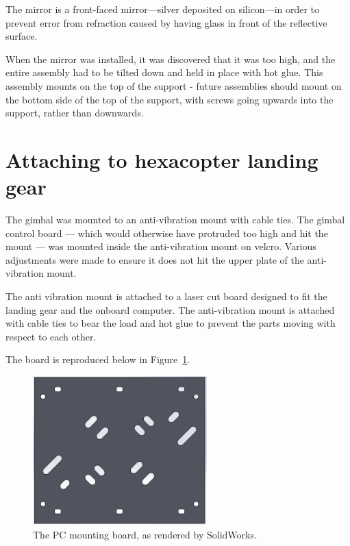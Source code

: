 \documentclass[12pt,oneside,a4paper,draft]{book}
\begin{document}
The mirror is a front-faced mirror---silver deposited on silicon---in
order to prevent error from refraction caused by having glass in front
of the reflective surface.

When the mirror was installed, it was discovered that it was too high,
and the entire assembly had to be tilted down and held in place with
hot glue. This assembly mounts on the top of the support - future
assemblies should mount on the bottom side of the top of the support,
with screws going upwards into the support, rather than downwards.

\newpage
\section{Attaching to hexacopter landing gear}
\label{sec:attach-hexac-land}

The gimbal was mounted to an anti-vibration mount with cable
ties. The gimbal control board --- which would otherwise have
protruded too high and hit the mount --- was mounted inside the
anti-vibration mount on velcro. Various adjustments were made to
ensure it does not hit the upper plate of the anti-vibration mount.

The anti vibration mount is attached to a laser cut board designed to
fit the landing gear and the onboard computer. The anti-vibration
mount is attached with cable ties to bear the load and hot glue to
prevent the parts moving with respect to each other.

The board is reproduced below in Figure~\ref{fig:pc-mount}.

\begin{figure}[h]
  \centering
    \includegraphics[width=0.6\textwidth]{figs/pc-mount}
  \caption{The PC mounting board, as rendered by SolidWorks.}
  \label{fig:pc-mount}
\end{figure}
\end{document}
